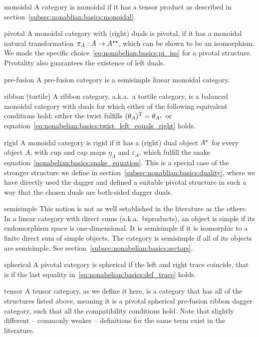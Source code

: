 \begin{jargon}
    \item[monoidal]
    A category is monoidal if it has a tensor product as described in section~\ref{subsec:nonablian:basics:monoidal}.
    
    \item[pivotal]
    A monoidal category with (right) duals is pivotal, if it has a monoidal natural transformation $\pi_A: A \to A^{\star\star}$, which can be shown to be an isomorphism. We made the specific choice~\eqref{eq:nonabelian:basics:pi_iso} for a pivotal structure.
    Pivotality also guarantees the existence of left duals.
    
    \item[pre-fusion]
    A pre-fusion category is a semisimple linear monoidal category.
    
    \item[ribbon (tortile)]
    A ribbon category, a.k.a.~a tortile category, is a balanced monoidal category with duals for which either of the following equivalent conditions hold; either the twist fulfills $(\theta_A)^{\text{T}} = \theta_{A^\star}$ or equation~\eqref{eq:nonabelian:basics:twist_left_equals_right} holds.
    
    \item[rigid]
    A monoidal category is rigid if it has a (right) dual object $A^\star$ for every object $A$, with cup and cap maps $\eta_A$ and $\varepsilon_A$, which fulfill the snake equation~\eqref{nonabelian:basics:snake_equation}.
    This is a special case of the stronger structure we define in section~\ref{subsec:nonablian:basics:duality}, where we have directly used the dagger and defined a suitable pivotal structure in such a way that the chosen duals are both-sided dagger duals.
    
    \item[semisimple]
    This notion is not as well established in the literature as the others. In a linear category with direct sums (a.k.a.~biproducts), an object is simple if its endomorphism space is one-dimensional.
    It is semisimple if it is isomorphic to a finite direct sum of simple objects.
    The category is semisimple if all of its objects are semisimple.
    See section~\ref{subsec:nonabelian:basics:sectors}.
    
    \item[spherical]
    A pivotal category is spherical if the left and right trace coincide, that is if the last equality in~\eqref{eq:nonabelian:basics:def_trace} holds.
    
    \item[tensor]
    A tensor category, as we define it here, is a category that has all of the structures listed above, meaning it is a pivotal spherical pre-fusion ribbon dagger category, such that all the compatibility conditions hold.
    Note that slightly different -- commonly weaker -- definitions for the same term exist in the literature.
\end{jargon}

